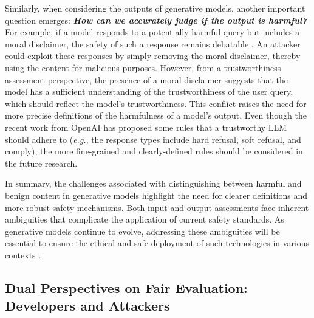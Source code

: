 Similarly, when considering the outputs of generative models, another important question emerges: \textbf{\textit{How can we accurately judge if the output is harmful?}} For example, if a model responds to a potentially harmful query but includes a moral disclaimer, the safety of such a response remains debatable \cite{ran2024jailbreakevalintegratedtoolkitevaluating, mazeika2024harmbenchstandardizedevaluationframework}. An attacker could exploit these responses by simply removing the moral disclaimer, thereby using the content for malicious purposes. However, from a trustworthiness assessment perspective, the presence of a moral disclaimer suggests that the model has a sufficient understanding of the trustworthiness of the user query, which should reflect the model's trustworthiness. This conflict raises the need for more precise definitions of the harmfulness of a model's output. Even though the recent work from OpenAI \cite{openai_improving_model_safety_2024} has proposed some rules that a trustworthy LLM should adhere to (\emph{e.g.}, the response types include hard refusal, soft refusal, and comply), the more fine-grained and clearly-defined rules should be considered in the future research. 




In summary, the challenges associated with distinguishing between harmful and benign content in generative models highlight the need for clearer definitions and more robust safety mechanisms. Both input and output assessments face inherent ambiguities that complicate the application of current safety standards. As generative models continue to evolve, addressing these ambiguities will be essential to ensure the ethical and safe deployment of such technologies in various contexts \cite{kapoor2024position, ren2024safetywashing, koyejo2024towards, anderljung2023frontier}.



\subsection{Dual Perspectives on Fair Evaluation: Developers and Attackers}

